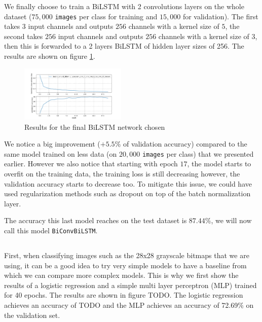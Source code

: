 \documentclass[10pt,twocolumn,letterpaper]{article}
\begin{document}
We finally choose to train a BiLSTM with 2 convolutions layers on the whole dataset ($75,000$ \texttt{images} per class for training and $15,000$ for validation). The first takes $3$ input channels and outputs $256$ channels with a kernel size of $5$, the second takes $256$ input channels and outputs $256$ channels with a kernel size of $3$, then this is forwarded to a 2 layers BiLSTM of hidden layer sizes of 256. The results are shown on figure \ref{fig:final_lstm_results}.

\begin{figure}[h] 
\centering
\includegraphics[width=0.45\textwidth]{images/lstm_final_result.png}
\caption{Results for the final BiLSTM network chosen}
\label{fig:final_lstm_results}
\end{figure}

We notice a big improvement ($+5.5\%$ of validation accuracy) compared to the same model trained on less data (on $20,000$ \texttt{images} per class) that we presented earlier. However we also notice that starting with epoch $17$, the model starts to overfit on the training data, the training loss is still decreasing however, the validation accuracy starts to decrease too. To mitigate this issue, we could have used regularization methods such as dropout on top of the batch normalization \cite{ioffe2015batch} layer.

The accuracy this last model reaches on the test dataset is $87.44\%$, we will now call this model \texttt{BiConvBiLSTM}.

\subsection{\cnnTitle{}}

First, when classifying images such as the 28x28 grayscale bitmaps that we are using, it can be a good idea to try very simple models to have a baseline from which we can compare more complex models. This is why we first show the results of a logistic regression and a simple multi layer perceptron (MLP) trained for 40 epochs. The results are shown in figure TODO. The logistic regression achieves an accuracy of TODO and the MLP achieves an accuracy of 72.69\% on the validation set.
\end{document}
